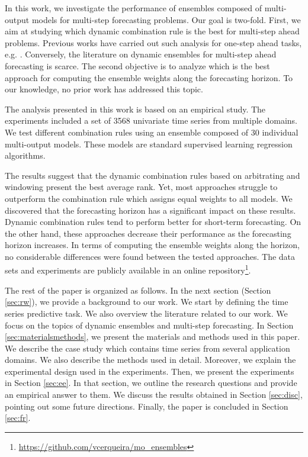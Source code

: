\documentclass[smallcondensed]{svjour3}
\begin{document}
In this work, we investigate the performance of ensembles composed of multi-output models for multi-step forecasting problems. 
Our goal is two-fold. First, we aim at studying which dynamic combination rule is the best for multi-step ahead problems. Previous works have carried out such analysis for one-step ahead tasks, e.g. \cite{cerqueira2019arbitrage}. Conversely, the literature on dynamic ensembles for multi-step ahead forecasting is scarce.
The second objective is to analyze which is the best approach for computing the ensemble weights along the forecasting horizon. To our knowledge, no prior work has addressed this topic.

The analysis presented in this work is based on an empirical study. The experiments included a set of 3568 univariate time series from multiple domains. We test different combination rules using an ensemble composed of 30 individual multi-output models. These models are standard supervised learning regression algorithms.

The results suggest that the dynamic combination rules based on arbitrating \cite{cerqueira2019arbitrage} and windowing \cite{newbold1974experience} present the best average rank. Yet, most approaches struggle to outperform the combination rule which assigns equal weights to all models. We discovered that the forecasting horizon has a significant impact on these results. Dynamic combination rules tend to perform better for short-term forecasting. On the other hand, these approaches decrease their performance as the forecasting horizon increases.
In terms of computing the ensemble weights along the horizon, no considerable differences were found between the tested approaches. 
The data sets and experiments are publicly available in an online repository\footnote{\url{https://github.com/vcerqueira/mo_ensembles}}.

The rest of the paper is organized as follows. In the next section (Section \ref{sec:rw}), we provide a background to our work. We start by defining the time series predictive task. We also overview the literature related to our work. We focus on the topics of dynamic ensembles and multi-step forecasting.
In Section \ref{sec:materialsmethods}, we present the materials and methods used in this paper. We describe the case study which contains time series from several application domains. We also describe the methods used in detail. Moreover, we explain the experimental design used in the experiments.
Then, we present the experiments in Section \ref{sec:ee}. In that section, we outline the research questions and provide an empirical answer to them.
We discuss the results obtained in Section \ref{sec:disc}, pointing out some future directions. Finally, the paper is concluded in Section \ref{sec:fr}.
\end{document}
